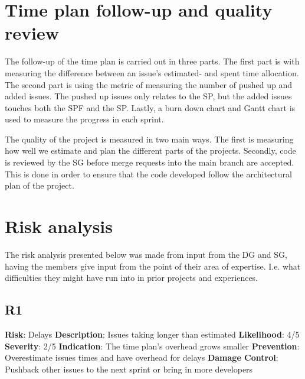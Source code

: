 \documentclass{article}
\begin{document}
\section{Time plan follow-up and quality review}
The follow-up of the time plan is carried out in three parts. The first part is with measuring the difference between an issue's estimated- and spent time allocation. The second part is using the metric of measuring the number of pushed up and added issues. The pushed up issues only relates to the SP, but the added issues touches both the SPF and the SP. Lastly, a burn down chart and Gantt chart is used to measure the progress in each sprint. 

The quality of the project is measured in two main ways. The first is measuring how well we estimate and plan the different parts of the projects. Secondly, code is reviewed by the SG before merge requests into the main branch are accepted. This is done in order to ensure that the code developed follow the architectural plan of the project. 

\section{Risk analysis}
The risk analysis presented below was made from input from the DG and SG, having the members give input from the point of their area of expertise. I.e. what difficulties they might have run into in prior projects and experiences. 

\subsection{R1}
\textbf{Risk}: Delays\newline
\textbf{Description}: Issues taking longer than estimated\newline
\textbf{Likelihood}: 4/5\newline
\textbf{Severity}: 2/5\newline
\textbf{Indication}: The time plan's overhead grows smaller\newline
\textbf{Prevention}: Overestimate  issues times and have overhead for delays\newline
\textbf{Damage Control}: Pushback other issues to the next sprint or bring in more developers\newline
\end{document}
